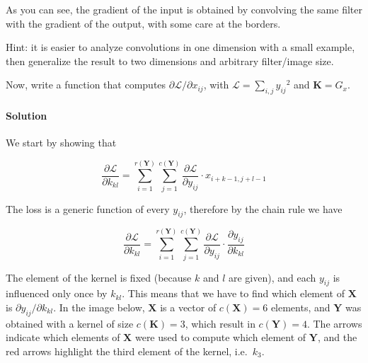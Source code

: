 \documentclass[
  a4paper,
]{article}
\begin{document}
As you can see, the gradient of the input is obtained by convolving the
same filter with the gradient of the output, with some care at the
borders.

Hint: it is easier to analyze convolutions in one dimension with a small
example, then generalize the result to two dimensions and arbitrary
filter/image size.

Now, write a function that computes
\(\partial \mathcal{L}/\partial x_{ij}\), with
\(\mathcal{L}=\sum_{i,j}{y_{ij}}^2\) and \(\textbf{K}=G_x\).

\hypertarget{solution}{%
\paragraph{Solution}\label{solution}}

We start by showing that

\begin{equation}
\frac{\partial\mathcal{L}}{\partial k_{kl}}=\sum_{i=1}^{r(\textbf{Y})}\sum_{j=1}^{c(\textbf{Y})}\frac{\partial\mathcal{L}}{\partial y_{ij}}\cdot x_{i+k-1,j+l-1}
\end{equation}

The loss is a generic function of every \(y_{ij}\), therefore by the
chain rule we have

\begin{equation}
\frac{\partial\mathcal{L}}{\partial k_{kl}}=\sum_{i=1}^{r(\textbf{Y})}\sum_{j=1}^{c(\textbf{Y})}\frac{\partial\mathcal{L}}{\partial y_{ij}}\cdot\frac{\partial y_{ij}}{\partial k_{kl}}
\end{equation}

The element of the kernel is fixed (because \(k\) and \(l\) are given),
and each \(y_{ij}\) is influenced only once by \(k_{kl}\). This means
that we have to find which element of \(\textbf{X}\) is
\(\partial y_{ij}/\partial k_{kl}\). In the image below, \(\textbf{X}\)
is a vector of \(c(\textbf{X})=6\) elements, and \(\textbf{Y}\) was
obtained with a kernel of size \(c(\textbf{K})=3\), which result in
\(c(\textbf{Y})=4\). The arrows indicate which elements of
\(\textbf{X}\) were used to compute which element of \(\textbf{Y}\), and
the red arrows highlight the third element of the kernel, i.e.~\(k_3\).
\end{document}
